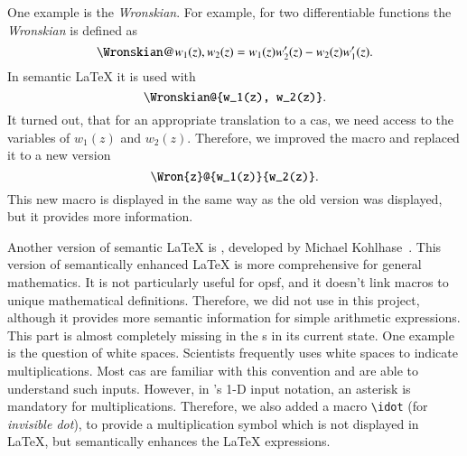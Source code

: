 One example is the \textit{Wronskian}. For example, for two differentiable functions the \textit{Wronskian} is defined as~\cite[(1.13.4)]{NIST:DLMF}
\begin{equation}
	\Wronskian@{w_1(z), w_2(z)} = w_1(z)w_2'(z) - w_2(z)w_1'(z).
\end{equation}
In semantic \LaTeX{} it is used with
\begin{equation}
	\verb|\Wronskian@{w_1(z), w_2(z)}|.
\end{equation}
It turned out, that for an appropriate translation to a \gls{cas}, we need access to the variables of $w_1(z)$ and $w_2(z)$. Therefore, we improved the macro and replaced it to a new version
\begin{equation}
	\verb|\Wron{z}@{w_1(z)}{w_2(z)}|.
\end{equation}
This new macro is displayed in the same way as the old version was displayed, but it provides more information. 

Another version of semantic \LaTeX{} is \sTeX, developed by Michael Kohlhase~\cite{sTeX}. This version of semantically enhanced \LaTeX{} is more comprehensive for general mathematics. It is not particularly useful for \gls{opsf}, and it doesn't link macros to unique mathematical definitions. Therefore, we did not use \sTeX{} in this project, although it provides more semantic information for simple arithmetic expressions. This part is almost completely missing in the \Macro s in its current state. One example is the question of white spaces. Scientists frequently uses white spaces to indicate multiplications. Most \gls{cas} are familiar with this convention and are able to understand such inputs. However, in \Maple's 1-D input notation, an asterisk is mandatory for multiplications. Therefore, we also added a macro \verb|\idot| (for \textit{invisible dot}), to provide a multiplication symbol which is not displayed in \LaTeX, but semantically enhances the \LaTeX{} expressions.
